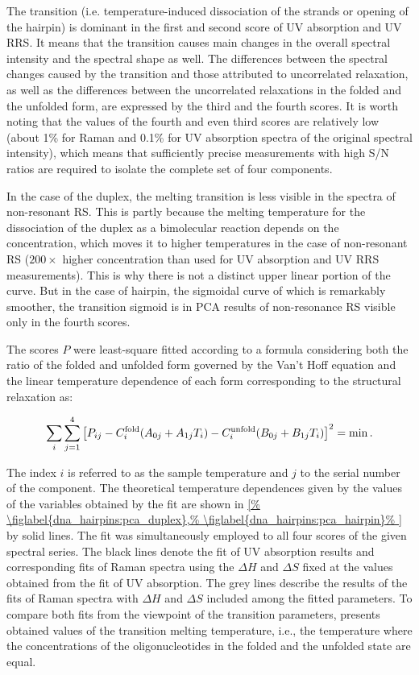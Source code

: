 The transition (i.e. temperature-induced dissociation of the strands or opening
of the hairpin) is dominant in the first and second score of UV absorption and
UV RRS.
It means that the transition causes main changes in the overall spectral
intensity and the spectral shape as well.
The differences between the spectral changes caused by the transition and those
attributed to uncorrelated relaxation, as well as the differences between the
uncorrelated relaxations in the folded and the unfolded form, are expressed by
the third and the fourth scores.
It is worth noting that the values of the fourth and even third scores are
relatively low (about 1\% for Raman and 0.1\% for UV absorption spectra of the
original spectral intensity), which means that sufficiently precise
measurements with high S/N ratios are required to isolate the complete set of
four components.

In the case of the duplex, the melting transition is less visible in the
spectra of non-resonant RS.
This is partly because the melting temperature for the dissociation of the
duplex as a bimolecular reaction depends on the concentration, which moves it
to higher temperatures in the case of non-resonant RS ($200\times$ higher
concentration than used for UV absorption and UV RRS measurements).
This is why there is not a distinct upper linear portion of the curve.
But in the case of hairpin, the sigmoidal curve of which is remarkably
smoother, the transition sigmoid is in PCA results of non-resonance RS visible
only in the fourth scores.

The scores $P$ were least-square fitted according to a formula considering both
the ratio of the folded and unfolded form governed by the Van’t Hoff equation
and the linear temperature dependence of each form corresponding to the
structural relaxation as:

\begin{equation*}
	\sum_i\sum_{j=1}^4\left[
		P_{ij} - C_i^\text{fold}(A_{0j} + A_{1j}T_i)
		- C_i^\text{unfold}(B_{0j} + B_{1j}T_i)
	\right]^2 = \operatorname{min}.
\end{equation*}

The index $i$ is referred to as the sample temperature and $j$ to the serial
number of the component.
The theoretical temperature dependences given by the values of the variables
obtained by the fit are shown in
\cref{%
	\figlabel{dna_hairpins:pca_duplex},%
	\figlabel{dna_hairpins:pca_hairpin}%
}
by solid lines.
The fit was simultaneously employed to all four scores of the given spectral
series.
The black lines denote the fit of UV absorption results and corresponding fits
of Raman spectra using the $\Delta{}H$ and $\Delta{}S$ fixed at the values
obtained from the fit of UV absorption.
The grey lines describe the results of the fits of Raman spectra with
$\Delta{}H$ and $\Delta{}S$ included among the fitted parameters.
To compare both fits from the viewpoint of the transition parameters,
presents obtained values of the transition melting temperature, i.e., the
temperature where the concentrations of the oligonucleotides in the folded and
the unfolded state are equal.

